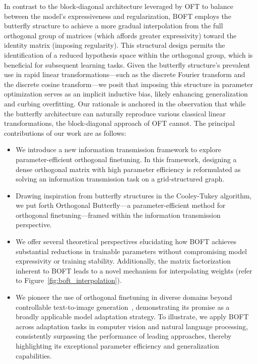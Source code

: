 In contrast to the block-diagonal architecture leveraged by OFT to balance between the model's expressiveness and regularization, BOFT employs the butterfly structure to achieve a more gradual interpolation from the full orthogonal group of matrices (which affords greater expressivity) toward the identity matrix (imposing regularity). This structural design permits the identification of a reduced hypothesis space within the orthogonal group, which is beneficial for subsequent learning tasks. Given the butterfly structure's prevalent use in rapid linear transformations—such as the discrete Fourier transform and the discrete cosine transform—we posit that imposing this structure in parameter optimization serves as an implicit inductive bias, likely enhancing generalization and curbing overfitting. Our rationale is anchored in the observation that while the butterfly architecture can naturally reproduce various classical linear transformations, the block-diagonal approach of OFT cannot. The principal contributions of our work are as follows:

\begin{itemize}[leftmargin=*,nosep]
    \item We introduce a new information transmission framework to explore parameter-efficient orthogonal finetuning. In this framework, designing a dense orthogonal matrix with high parameter efficiency is reformulated as solving an information transmission task on a grid-structured graph.
    \item Drawing inspiration from butterfly structures in the Cooley-Tukey algorithm, we put forth Orthogonal Butterfly—a parameter-efficient method for orthogonal finetuning—framed within the information transmission perspective.
    \item We offer several theoretical perspectives elucidating how BOFT achieves substantial reductions in trainable parameters without compromising model expressivity or training stability. Additionally, the matrix factorization inherent to BOFT leads to a novel mechanism for interpolating weights (refer to Figure~\ref{fig:boft_interpolation}).
    \item We pioneer the use of orthogonal finetuning in diverse domains beyond controllable text-to-image generation~\cite{qiu2023controlling}, demonstrating its promise as a broadly applicable model adaptation strategy. To illustrate, we apply BOFT across adaptation tasks in computer vision and natural language processing, consistently surpassing the performance of leading approaches, thereby highlighting its exceptional parameter efficiency and generalization capabilities.
\end{itemize}

